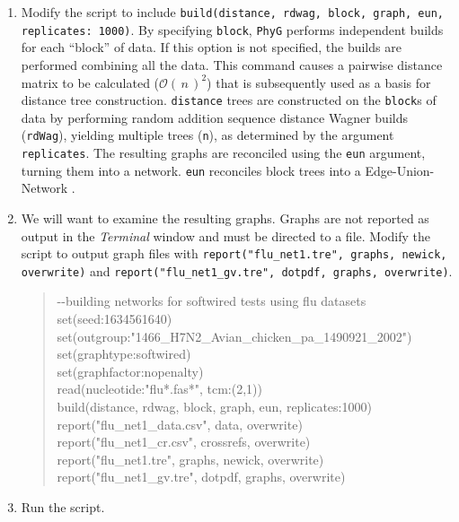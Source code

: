 \documentclass[11pt]{article}
\newcommand{\phyg}{\texttt{PhyG} }
\newcommand{\BigO}[1]{\ensuremath{\mathcal{O}\left(\,#1\,\right)}\xspace}
\begin{document}
\begin{enumerate}

\item Modify the script to include \texttt{build(distance, rdwag, block, graph, eun, 
replicates: 1000)}. By specifying \texttt{block}, \phyg performs independent builds 
for each ``block'' of data. If this option is not specified, the builds are performed 
combining all the data. This command causes a pairwise distance matrix to be 
calculated ($\BigO n^2$) that is subsequently used as a basis for distance tree 
construction. \texttt{distance} trees are constructed on the \texttt{block}s of data 
by performing random addition sequence distance Wagner builds (\texttt{rdWag}), 
yielding multiple trees (\texttt{n}), as determined by the argument \texttt{replicates}. 
The resulting graphs are reconciled using the \texttt{eun} argument, turning them 
into a network. \texttt{eun} reconciles block trees into a Edge-Union-Network 
\citep{MiyagiandWheeler2019, Wheeler2022}.

\item We will want to examine the resulting graphs. Graphs are not reported as 
output in the \textit{Terminal} window and must be directed to a file. Modify the 
script to output graph files with \texttt{report("flu\_net1.tre", graphs, newick, 
overwrite)} and \texttt{report("flu\_net1\_gv.tre", dotpdf, graphs, overwrite)}.

	\begin{quote}	
	-\/-building networks for softwired tests using flu datasets\\
	set(seed:1634561640)\\
	set(outgroup:"1466\_H7N2\_Avian\_chicken\_pa\_1490921\_2002")\\
	set(graphtype:softwired)\\
	set(graphfactor:nopenalty)\\ 
	read(nucleotide:"flu*.fas*", tcm:(2,1))\\
	build(distance, rdwag, block, graph, eun, replicates:1000)\\
	report("flu\_net1\_data.csv", data, overwrite)\\
	report("flu\_net1\_cr.csv", crossrefs, overwrite)\\
	report("flu\_net1.tre", graphs, newick, overwrite)\\
	report("flu\_net1\_gv.tre", dotpdf, graphs, overwrite)
	\end{quote}
	
\item Run the script.


\end{enumerate}
\end{document}
